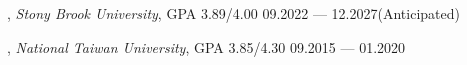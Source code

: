 


, \textit{Stony Brook University}, GPA 3.89/4.00	\hfill 09.2022 --- 12.2027(Anticipated)

, \textit{National Taiwan University}, GPA 3.85/4.30 \hfill	09.2015 --- 01.2020

